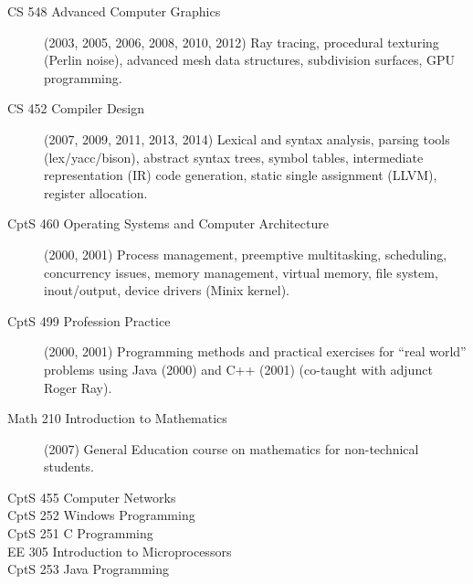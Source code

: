 \documentclass[10pt]{article}
\begin{document}
\begin{description}
  \item[CS 548 Advanced Computer Graphics] (2003, 2005, 2006, 2008, 2010, 2012) Ray tracing, procedural 
      texturing (Perlin noise), advanced mesh data structures, subdivision surfaces, GPU programming.
  \item[CS 452 Compiler Design] (2007, 2009, 2011, 2013, 2014) Lexical and syntax analysis, parsing tools
     (lex/yacc/bison), abstract syntax trees, symbol tables, intermediate representation (IR) code generation,
     static single assignment (LLVM), register allocation.
  \item[CptS 460 Operating Systems and Computer Architecture] (2000, 2001) Process management, 
     preemptive multitasking, scheduling, concurrency issues, memory management, virtual memory, file system,
     inout/output, device drivers (Minix kernel).
  \item[CptS 499 Profession Practice] (2000, 2001) Programming methods and practical exercises
     for ``real world'' problems using
     Java (2000) and C++ (2001) (co-taught with adjunct Roger Ray).
  \item[Math 210 Introduction to Mathematics] (2007) General Education course on mathematics for non-technical
     students.
\end{description}

\begin{description}
  \item[CptS 455 Computer Networks]
  \item[CptS 252 Windows Programming]
  \item[CptS 251 C Programming] 
  \item[EE 305 Introduction to Microprocessors]
  \item[CptS 253 Java Programming]
\end{description}


\\
\end{document}
